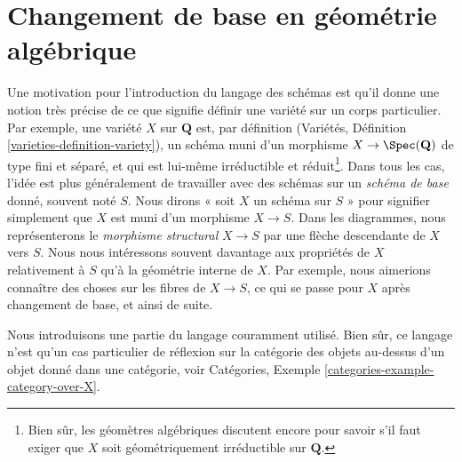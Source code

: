 \section{Changement de base en géométrie algébrique}
\label{section-base-change}

\noindent
Une motivation pour l'introduction du langage des schémas est qu'il donne une
notion très précise de ce que signifie définir une variété sur un corps
particulier. Par exemple, une variété  $X$  sur  $\mathbf{Q}$  est, par définition
(Variétés, Définition  \ref{varieties-definition-variety}), un schéma muni d'un morphisme  $X \to \Spec(\mathbf{Q})$  de type fini et séparé,
et qui est lui-même irréductible et réduit\footnote{Bien sûr, les géomètres algébriques
discutent encore pour savoir s'il faut exiger que  $X$  soit
géométriquement irréductible sur  $\mathbf{Q}$.}. Dans tous les cas,
l'idée est plus généralement de travailler avec des schémas sur un
{\it schéma de base} donné, souvent noté
 $S$. Nous dirons « soit  $X$ un schéma
sur $S$ » pour signifier simplement que $X$ est muni d'un
morphisme $X \to S$. Dans les diagrammes, nous représenterons le
 {\it morphisme structural}   $X \to S$ par une
flèche descendante de $X$ vers $S$. Nous nous intéressons
souvent davantage aux propriétés de $X$ relativement à $S$ qu'à
la géométrie interne de $X$. Par exemple, nous aimerions connaître des
choses sur les fibres de  $X \to S$, ce qui se passe pour  $X$  après
changement de base, et ainsi de suite.

\medskip\noindent
Nous introduisons une partie du langage couramment utilisé. Bien sûr, ce
langage n'est qu'un cas particulier de réflexion sur la catégorie des objets
au-dessus d'un objet donné dans une catégorie, voir Catégories, Exemple
 \ref{categories-example-category-over-X}.

